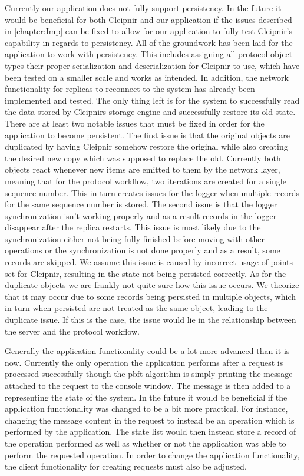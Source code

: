 Currently our application does not fully support persistency. In the future it would be beneficial for both Cleipnir and our application if the issues described in \autoref{chapter:Imp} can be fixed to allow for our application to fully test Cleipnir's capability in regards to persistency. All of the groundwork has been laid for the application to work with persistency. This includes assigning all protocol object types their proper serialization and deserialization for Cleipnir to use, which have been tested on a smaller scale and works as intended. In addition, the network functionality for replicas to reconnect to the system has already been implemented and tested. The only thing left is for the system to successfully read the data stored by Cleipnirs storage engine and successfully restore its old state.
There are at least two notable issues that must be fixed in order for the application to become persistent. The first issue is that the original  objects are duplicated by having Cleipnir somehow restore the original  while also creating the desired new copy which was supposed to replace the old. Currently both  objects react whenever new items are emitted to them by the network layer, meaning that for the protocol workflow, two iterations are created for a single sequence number. This in turn creates issues for the logger when multiple records for the same sequence number is stored. The second issue is that the logger synchronization isn't working properly and as a result records in the logger disappear after the replica restarts. This issue is most likely due to the synchronization either not being fully finished before moving with other operations or the synchronization is not done properly and as a result, some records are skipped. We assume this issue is caused by incorrect usage of  points set for Cleipnir, resulting in the state not being persisted correctly. As for the duplicate  objects we are frankly not quite sure how this issue occurs. We theorize that it may occur due to some records being persisted in multiple objects, which in turn when persisted are not treated as the same  object, leading to the duplicate issue. If this is the case, the issue would lie in the relationship between the server and the protocol workflow.

Generally the application functionality could be a lot more advanced than it is now. Currently the only operation the application performs after a request is processed successfully though the \ac{pbft} algorithm is simply printing the message attached to the request to the console window. The message is then added to a  representing the state of the system. In the future it would be beneficial if the application functionality was changed to be a bit more practical. For instance, changing the message content in the request to instead be an operation which is performed by the application. The state list would then instead store a record of the operation performed as well as whether or not the application was able to perform the requested operation. In order to change the application functionality, the client functionality for creating requests must also be adjusted.

